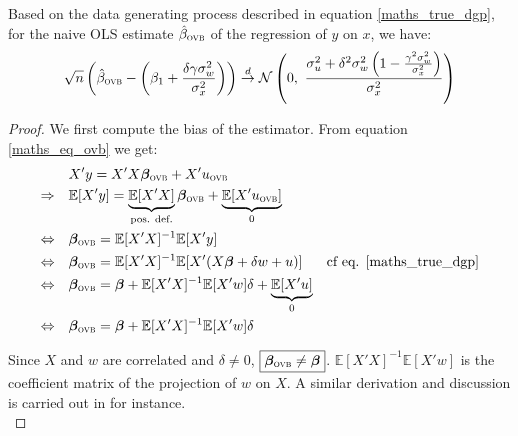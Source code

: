 \documentclass[a4paper, 11pt]{report}
\begin{document}
			\begin{lemma}\label{lemma_ovb}
				Based on the data generating process described in equation \ref{maths_true_dgp}, for the naive OLS estimate $\hat{\beta}_{\textsc{ovb}}$ of the regression of $y$ on $x$, we have:
				\[
						\sqrt{n}\left( \hat{\beta}_{\textsc{ovb}} - \left(\beta_{1} + \dfrac{\delta \gamma \sigma_{w}^{2}}{\sigma_{x}^{2}}\right) \right)
						 \overset{d}{\to} \mathcal{N}\left( 0 , \ \dfrac{ \sigma_{u}^{2} +  \delta^{2} \sigma_{w}^{2} \left(1 - \frac{\gamma^{2}\sigma_{w}^{2}}{\sigma_{x}^{2}} \right)}{\sigma_{x}^{2}} \right) 
				\]
			\end{lemma}
			
			\begin{proof} 
				We first compute the bias of the estimator. From equation  \ref{maths_eq_ovb} we get: 
				~
				\begin{equation}\label{bias_ovb}
					\begin{aligned}
            					& X'y = X'X\bm{\beta}_{\textsc{ovb}} + X'u_{\textsc{ovb}}\\
            					\Rightarrow \quad & \mathbb{E}[X'y] = \underbrace{\mathbb{E}[X'X]}_{\text{pos. def.}}\bm{\beta}_{\textsc{ovb}} + \underbrace{\mathbb{E}[X'u_{\textsc{ovb}}]}_{0} \\
            					\Leftrightarrow \quad & \bm{\beta}_{\textsc{ovb}} = \mathbb{E}[X'X]^{-1} \mathbb{E}[X'y]\\
            					\Leftrightarrow \quad & \bm{\beta}_{\textsc{ovb}} = \mathbb{E}[X'X]^{-1} \mathbb{E}[X'(X\bm{\beta} + \delta w + u)] & \text{cf eq. \ref{maths_true_dgp}}\\
            					\Leftrightarrow \quad & \bm{\beta}_{\textsc{ovb}} = \bm{\beta} + \mathbb{E}[X'X]^{-1} \mathbb{E}[X'w] \delta + \underbrace{\mathbb{E}[X'u]}_{0}\\
            					\Leftrightarrow \quad & \bm{\beta}_{\textsc{ovb}} = \bm{\beta} + \mathbb{E}[X'X]^{-1} \mathbb{E}[X'w] \delta
					\end{aligned}
				\end{equation}		
				
				Since $X$ and $w$ are correlated and $\delta \neq 0$, $\boxed{\bm{\beta}_{\textsc{ovb}} \neq \bm{\beta}}$. $ \mathbb{E}[X'X]^{-1} \mathbb{E}[X'w]$ is the coefficient matrix of the projection of $w$ on $X$. A similar derivation and discussion is carried out in \cite{hansen_econometrics_2022} for instance.\\ %
				

\end{proof}
\end{document}
